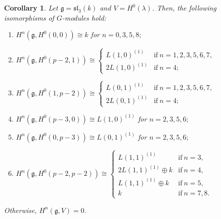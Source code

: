 \documentclass[pdftex]{sigma}%
\numberwithin{equation}{section}
\newtheorem{Corollary}[Theorem]{Corollary}
\begin{document}
\begin{Corollary}\label{c2} Let $\mathfrak{g}=\mathfrak{sl}_3(k)$ and $V=H^0(\lambda)$. Then, the following isomorphisms of $G$-mo\-dules hold:

\begin{enumerate}\itemsep=0pt

\item[$(a)$] $H^n(\mathfrak{g},H^0(0,0))\cong k$ for $n=0,3,5,8;$

\item[$(b)$] $H^n(\mathfrak{g},H^0(p-2,1))\cong
\begin{cases}
L(1,0)^{(1)}&\text{if}\ n=1,2,3,5,6,7,\\
2L(1,0)^{(1)}&\text{if}\ n=4;
\end{cases}$

\item[$(c)$] $H^n(\mathfrak{g},H^0(1,p-2))\cong
\begin{cases}
L(0,1)^{(1)}&\text{if}\ n=1,2,3,5,6,7,\\
2L(0,1)^{(1)}&\text{if}\ n=4;
\end{cases}$

\item[$(d)$] $H^n(\mathfrak{g},H^0(p-3,0))\cong L(1,0)^{(1)}$ for $n=2,3,5,6;$

\item[$(e)$] $H^n(\mathfrak{g},H^0(0,p-3))\cong L(0,1)^{(1)}$ for $n=2,3,5,6;$

\item[$(f)$] $H^n(\mathfrak{g},H^0(p-2,p-2))\cong
\begin{cases}
L(1,1)^{(1)}&\text{if}\ n=3,\\
2L(1,1)^{(1)}\oplus k&\text{if}\ n=4,\\
L(1,1)^{(1)}\oplus k&\text{if}\ n=5,\\
k&\text{if}\ n=7,8.
\end{cases}$
\end{enumerate}
 Otherwise, $H^n(\mathfrak{g},V)=0$.
\end{Corollary}
\end{document}
